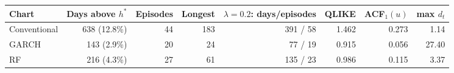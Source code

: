\begin{tabular}{lrrrrrrr}
\toprule
Chart & Days above $h^*$ & Episodes & Longest & $\lambda=0.2$: days/episodes & QLIKE & ACF$_1(u)$ & max $d_t$ \\
\midrule
Conventional & 638 (12.8\%) & 44 & 183 & 391 / 58 & 1.462 & 0.273 & 1.14 \\
GARCH & 143 (2.9\%) & 20 & 24 & 77 / 19 & 0.915 & 0.056 & 27.40 \\
RF & 216 (4.3\%) & 27 & 61 & 135 / 23 & 0.986 & 0.115 & 3.37 \\
\bottomrule
\end{tabular}
